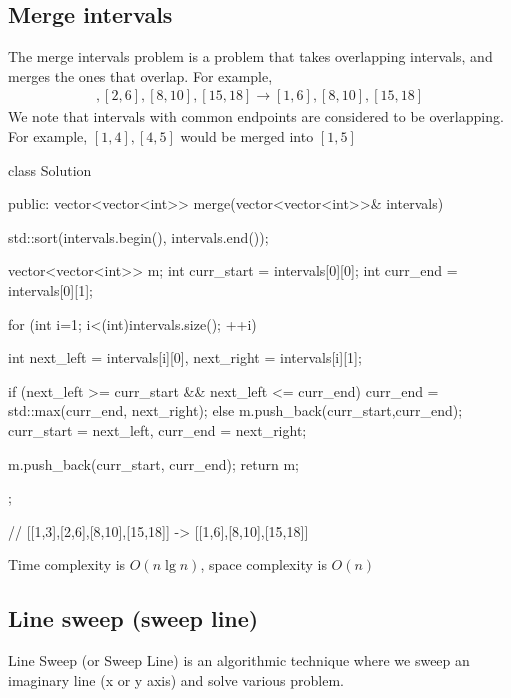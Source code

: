 \documentclass{report}
\begin{document}
\subsection{Merge intervals}
\bigbreak \noindent 
The merge intervals problem is a problem that takes overlapping intervals, and merges the ones that overlap. For example,
\begin{align*}
    [1,3], [2,6], [8,10], [15,18] \to [1,6], [8,10], [15,18]
\end{align*}
We note that intervals with common endpoints are considered to be overlapping. For example, $[1,4], [4,5]$ would be merged into $[1,5]$
\bigbreak \noindent 
\begin{cppcode}
    class Solution {
        public:
        vector<vector<int>> merge(vector<vector<int>>& intervals) {
            std::sort(intervals.begin(), intervals.end());

            vector<vector<int>> m;
            int curr_start = intervals[0][0];
            int curr_end = intervals[0][1];

            for (int i=1; i<(int)intervals.size(); ++i) {
                int next_left = intervals[i][0], next_right = intervals[i][1];

            if (next_left >= curr_start && next_left <= curr_end) {
                curr_end = std::max(curr_end, next_right);
            } else {
                m.push_back({curr_start,curr_end});
                curr_start = next_left, curr_end = next_right;
            }
        }
        m.push_back({curr_start, curr_end});
        return m;
    }
};

// [[1,3],[2,6],[8,10],[15,18]] -> [[1,6],[8,10],[15,18]]
\end{cppcode}
\bigbreak \noindent 
Time complexity is $O(n\lg n)$, space complexity is $O(n)$

\pagebreak 
\subsection{Line sweep (sweep line)}
\bigbreak \noindent 
Line Sweep (or Sweep Line) is an algorithmic technique where we sweep an imaginary line (x or y axis) and solve various problem.
\bigbreak \noindent 
\end{document}
